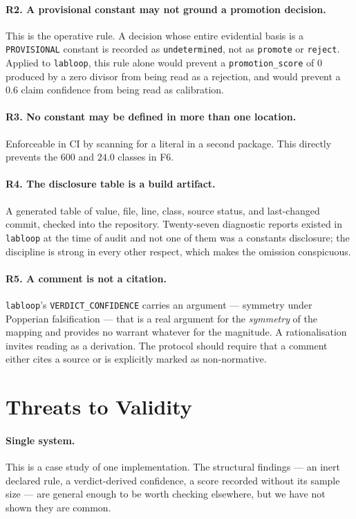 \documentclass[10pt,twocolumn,letterpaper]{article}
\newcommand{\code}[1]{\texttt{#1}}
\begin{document}
\paragraph{R2. A provisional constant may not ground a promotion decision.} This is the operative
rule. A decision whose entire evidential basis is a \code{PROVISIONAL} constant is recorded as
\code{undetermined}, not as \code{promote} or \code{reject}. Applied to \code{labloop}, this rule
alone would prevent a \code{promotion\_score} of $0$ produced by a zero divisor from being read as
a rejection, and would prevent a $0.6$ claim confidence from being read as calibration.

\paragraph{R3. No constant may be defined in more than one location.} Enforceable in CI by
scanning for a literal in a second package. This directly prevents the $600$ and $24.0$ classes
in F6.

\paragraph{R4. The disclosure table is a build artifact.} A generated table of value, file, line,
class, source status, and last-changed commit, checked into the repository. Twenty-seven diagnostic
reports existed in \code{labloop} at the time of audit and not one of them was a constants
disclosure; the discipline is strong in every other respect, which makes the omission conspicuous.

\paragraph{R5. A comment is not a citation.} \code{labloop}'s \code{VERDICT\_CONFIDENCE} carries an
argument --- symmetry under Popperian falsification --- that is a real argument for the
\emph{symmetry} of the mapping and provides no warrant whatever for the magnitude. A rationalisation
invites reading as a derivation. The protocol should require that a comment either cites a source
or is explicitly marked as non-normative.

\section{Threats to Validity}
\label{sec:threats}

\paragraph{Single system.} This is a case study of one implementation. The structural findings
--- an inert declared rule, a verdict-derived confidence, a score recorded without its sample size
--- are general enough to be worth checking elsewhere, but we have not shown they are common.
\end{document}
